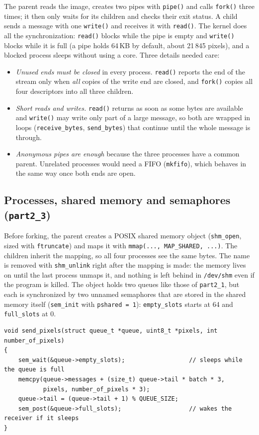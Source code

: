 \documentclass[11pt,a4paper]{article}
\begin{document}
The parent reads the image, creates two pipes with \texttt{pipe()} and calls \texttt{fork()} three
times; it then only waits for its children and checks their exit status. A child sends a message
with one \texttt{write()} and receives it with \texttt{read()}. The kernel does all the
synchronization: \texttt{read()} blocks while the pipe is empty and \texttt{write()} blocks while it
is full (a pipe holds 64\,KB by default, about 21\,845 pixels), and a blocked process sleeps without
using a core. Three details needed care:
\begin{itemize}\setlength{\itemsep}{1pt}
\item \emph{Unused ends must be closed} in every process. \texttt{read()} reports the end of the
stream only when \emph{all} copies of the write end are closed, and \texttt{fork()} copies all four
descriptors into all three children.
\item \emph{Short reads and writes.} \texttt{read()} returns as soon as some bytes are available and
\texttt{write()} may write only part of a large message, so both are wrapped in loops
(\texttt{receive\_bytes}, \texttt{send\_bytes}) that continue until the whole message is through.
\item \emph{Anonymous pipes are enough} because the three processes have a common parent. Unrelated
processes would need a FIFO (\texttt{mkfifo}), which behaves in the same way once both ends are open.
\end{itemize}

\subsection{Processes, shared memory and semaphores (\texttt{part2\_3})}

Before forking, the parent creates a POSIX shared memory object (\texttt{shm\_open}, sized with
\texttt{ftruncate}) and maps it with \texttt{mmap(..., MAP\_SHARED, ...)}. The children inherit the
mapping, so all four processes see the same bytes. The name is removed with \texttt{shm\_unlink}
right after the mapping is made: the memory lives on until the last process unmaps it, and nothing
is left behind in \texttt{/dev/shm} even if the program is killed. The object holds two queues like
those of \texttt{part2\_1}, but each is synchronized by two unnamed semaphores that are stored in
the shared memory itself (\texttt{sem\_init} with \texttt{pshared = 1}): \texttt{empty\_slots}
starts at 64 and \texttt{full\_slots} at 0.

\begin{lstlisting}
void send_pixels(struct queue_t *queue, uint8_t *pixels, int number_of_pixels)
{
    sem_wait(&queue->empty_slots);                  // sleeps while the queue is full
    memcpy(queue->messages + (size_t) queue->tail * batch * 3,
           pixels, number_of_pixels * 3);
    queue->tail = (queue->tail + 1) % QUEUE_SIZE;
    sem_post(&queue->full_slots);                   // wakes the receiver if it sleeps
}
\end{lstlisting}
\end{document}
